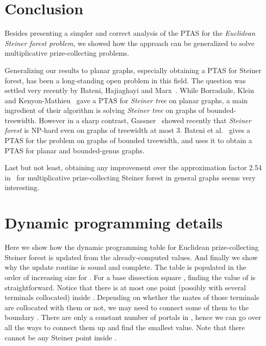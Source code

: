\documentclass[extras,11pt]{article} \usepackage{fullpage}
\theoremstyle{mytheorem}
\newcommand{\prob}[1]{\textit{#1}}
\begin{document}
\section{Conclusion}
\label{sec:conclusion} Besides presenting a simpler and correct
analysis of the PTAS for the \prob{Euclidean Steiner forest
problem}, we showed how the approach can be generalized to solve
multiplicative prize-collecting problems.



Generalizing our results to planar graphs, especially obtaining a
PTAS for Steiner forest, has been a long-standing open problem in this field.
The question was settled very recently by Bateni, Hajiaghayi and Marx~\cite{BHM09:forest}.
While Borradaile, Klein and Kenyon-Mathieu~\cite{BKM07} gave a
PTAS for \prob{Steiner tree} on planar graphs, a main ingredient
of their algorithm is solving \prob{Steiner tree} on graphs of
bounded-treewidth. However in a sharp contrast, Gassner~\cite{Gas08}
showed recently that \prob{Steiner forest} is NP-hard even on graphs of
treewidth at most 3.
Bateni et al.~\cite{BHM09:forest} 
gives a PTAS for the problem on graphs of bounded treewidth,
and uses it to obtain a PTAS for planar and bounded-genus graphs.


Last but not least, obtaining any improvement over the approximation
factor 2.54 in~\cite{HJ06} for multiplicative prize-collecting
Steiner forest in general graphs seems very interesting.




{ 
}














\appendix



\iffalse

\section{Dynamic programming details}\label{sec:dp-details}

Here we show how the dynamic programming table for Euclidean prize-collecting Steiner forest 
is updated from the already-computed values.
And finally we show why the update routine is sound and complete.
The table  is populated in the order of increasing size for .
For a base dissection square , finding the value of  is straightforward.
Notice that there is at most one point (possibly with several terminals collocated) inside .
Depending on whether the mates of those terminals are collocated with them or not, we may need to connect some of them to the boundary .
There are only a constant number of portals in , hence we can go over all the ways to connect them up and find the smallest value.
Note that there cannot be any Steiner point inside .
\end{document}
